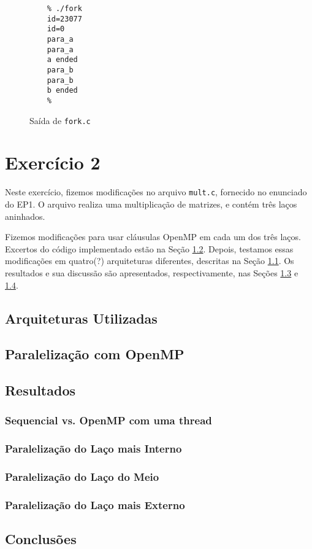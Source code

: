 \documentclass[a4paper, 12pt]{article}
\begin{document}
\begin{figure}[H]
    \centering
    \begin{lstlisting}
    % ./fork
    id=23077
    id=0
    para_a
    para_a
    a ended
    para_b
    para_b
    b ended
    %
    \end{lstlisting}
    \caption{Saída de \texttt{fork.c}}
    \label{fig:fork_out}
\end{figure}

\section{Exercício 2} \label{sec:ex2}

Neste exercício, fizemos modificações no arquivo \texttt{mult.c}, fornecido 
no enunciado do EP1. O arquivo realiza uma multiplicação de matrizes,
e contém três laços aninhados.

Fizemos modificações para usar cláusulas OpenMP em cada um dos três laços.
Excertos do código implementado estão na Seção \ref{sec:code}. Depois,
testamos essas modificações em quatro(?) arquiteturas diferentes, descritas
na Seção \ref{sec:arch}. Os resultados e sua discussão são apresentados,
respectivamente, nas Seções \ref{sec:res} e \ref{sec:dis}.

\subsection{Arquiteturas Utilizadas} \label{sec:arch}

\subsection{Paralelização com OpenMP} \label{sec:code}

\subsection{Resultados} \label{sec:res}

\subsubsection{Sequencial vs. OpenMP com uma thread}

\subsubsection{Paralelização do Laço mais Interno}

\subsubsection{Paralelização do Laço do Meio}

\subsubsection{Paralelização do Laço mais Externo}

\subsection{Conclusões} \label{sec:dis}

%
%
\end{document}
